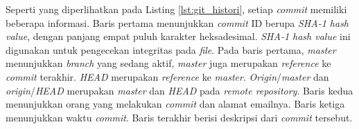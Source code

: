 Seperti yang diperlihatkan pada Listing \ref{lst:git_histori}, setiap \textit{commit} memiliki beberapa informasi. Baris pertama menunjukkan \textit{commit} ID berupa \textit{SHA-1 hash value}, dengan panjang empat puluh karakter heksadesimal. \textit{SHA-1 hash value} ini digunakan untuk pengecekan integritas pada \textit{file}. Pada baris pertama, \textit{master} menunjukkan \textit{branch} yang sedang aktif, \textit{master} juga merupakan \textit{reference} ke \textit{commit} terakhir. \textit{HEAD} merupakan \textit{reference} ke \textit{master}. \textit{Origin}/\textit{master} dan \textit{origin}/\textit{HEAD} merupakan \textit{master} dan \textit{HEAD} pada \textit{remote repository}. Baris kedua menunjukkan orang yang melakukan \textit{commit} dan alamat emailnya. Baris ketiga menunjukkan waktu \textit{commit}. Baris terakhir berisi deskripsi dari \textit{commit} tersebut.

